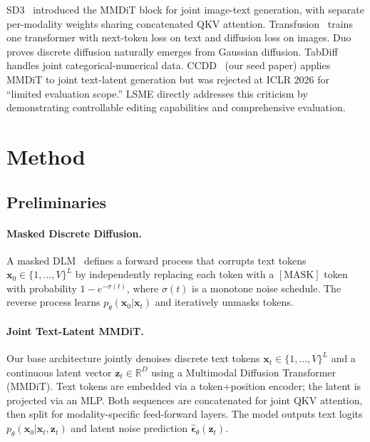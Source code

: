 \documentclass{article}
\begin{document}
SD3~\cite{sd3_2024} introduced the MMDiT block for joint image-text generation, with separate per-modality weights sharing concatenated QKV attention.
Transfusion~\cite{transfusion2025} trains one transformer with next-token loss on text and diffusion loss on images.
Duo~\cite{duo2025} proves discrete diffusion naturally emerges from Gaussian diffusion.
TabDiff~\cite{tabdiff2025} handles joint categorical-numerical data.
CCDD~\cite{ccdd2025} (our seed paper) applies MMDiT to joint text-latent generation but was rejected at ICLR 2026 for ``limited evaluation scope.''
LSME directly addresses this criticism by demonstrating controllable editing capabilities and comprehensive evaluation.

\section{Method}

\subsection{Preliminaries}

\paragraph{Masked Discrete Diffusion.}
A masked DLM~\cite{mdlm2024} defines a forward process that corrupts text tokens $\mathbf{x}_0 \in \{1, \ldots, V\}^L$ by independently replacing each token with a $[\text{MASK}]$ token with probability $1 - e^{-\sigma(t)}$, where $\sigma(t)$ is a monotone noise schedule.
The reverse process learns $p_\theta(\mathbf{x}_0 | \mathbf{x}_t)$ and iteratively unmasks tokens.

\paragraph{Joint Text-Latent MMDiT.}
Our base architecture jointly denoises discrete text tokens $\mathbf{x}_t \in \{1, \ldots, V\}^L$ and a continuous latent vector $\mathbf{z}_t \in \mathbb{R}^D$ using a Multimodal Diffusion Transformer (MMDiT).
Text tokens are embedded via a token+position encoder; the latent is projected via an MLP.
Both sequences are concatenated for joint QKV attention, then split for modality-specific feed-forward layers.
The model outputs text logits $p_\theta(\mathbf{x}_0 | \mathbf{x}_t, \mathbf{z}_t)$ and latent noise prediction $\hat{\boldsymbol{\epsilon}}_\theta(\mathbf{z}_t)$.
\end{document}
